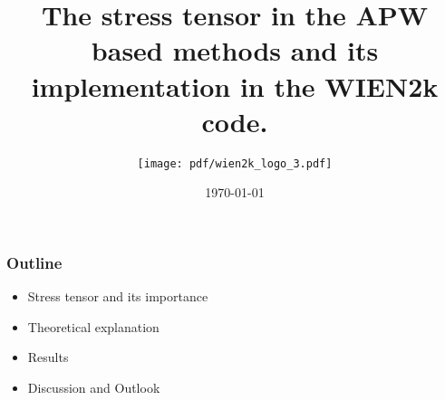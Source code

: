 \documentclass[10pt, handout]{beamer}
\begin{document}
	\author[K. Belbase]{\texttt{[image: pdf/wien2k\_logo\_3.pdf]} }%
\title{The stress tensor in the APW based methods and its implementation in the WIEN2k code.}
\date[November 30, 2018]
{ {} \today}


\begin{frame}[plain]
	\maketitle
\end{frame}




\begin{frame}
	\frametitle{Outline}
	\begin{itemize}
		\item Stress tensor and its importance
		\item Theoretical explanation
		\item Results
		\item Discussion and Outlook
	\end{itemize}
\end{frame}

\end{document}
